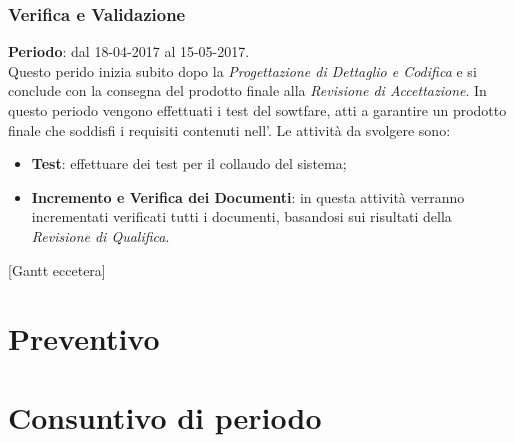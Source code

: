 	\subsubsection{Verifica e Validazione}
	\textbf{Periodo}: dal 18-04-2017 al 15-05-2017.
	\\ Questo perido inizia subito dopo la \textit{Progettazione di Dettaglio e Codifica} e si conclude con la consegna del prodotto finale alla \textit{Revisione di Accettazione}.
	In questo periodo vengono effettuati i test del sowtfare, atti a garantire un prodotto finale che soddisfi i requisiti contenuti nell'.
	Le attività da svolgere sono:
	\begin{itemize}
		\item \textbf{Test}: effettuare dei test per il collaudo del sistema;
		\item \textbf{Incremento e Verifica dei Documenti}: in questa attività verranno incrementati verificati tutti i documenti, basandosi sui risultati della \textit{Revisione di Qualifica}.
	\end{itemize}
	[Gantt eccetera]	
	\section{Preventivo}
\section{Consuntivo di periodo}


